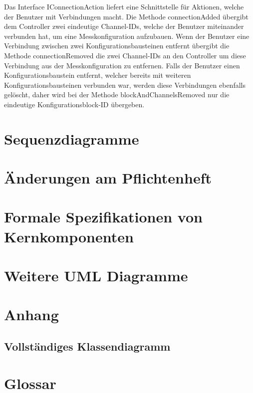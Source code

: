 \documentclass[parskip=full]{scrartcl}
\begin{document}
Das Interface IConnectionAction liefert eine Schnittstelle für Aktionen, welche der Benutzer mit Verbindungen macht. 
Die Methode connectionAdded übergibt dem Controller zwei eindeutige Channel-IDs, welche der Benutzer miteinander verbunden hat, um eine Messkonfiguration aufzubauen.
Wenn der Benutzer eine Verbindung zwischen zwei Konfigurationsbausteinen entfernt übergibt die Methode connectionRemoved die zwei Channel-IDs an den Controller um diese Verbindung aus der Messkonfiguration zu entfernen.
Falls der Benutzer einen Konfigurationsbaustein entfernt, welcher bereits mit weiteren Konfigurationsbausteinen verbunden war, werden diese Verbindungen ebenfalls gelöscht, daher wird bei der Methode blockAndChannelsRemoved nur die eindeutige Konfigurationsblock-ID übergeben.

\clearpage
\section{Sequenzdiagramme}


\clearpage
\section{Änderungen am Pflichtenheft}


\clearpage
\section{Formale Spezifikationen von Kernkomponenten}

\clearpage
\section{Weitere UML Diagramme}


\clearpage
\section{Anhang}


\clearpage
\subsection{Vollständiges Klassendiagramm}


\clearpage
\section{Glossar}\label{glossar}

\renewcommand*{\glossarysection}[2][]{}	%
\printnoidxglossaries				%
\end{document}

